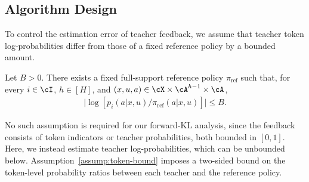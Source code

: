 \documentclass[11pt]{article}
\newcommand{\piref}{\pi_{\text{ref}}}
\begin{document}
\subsection{Algorithm Design}
To control the estimation error of teacher feedback, we assume that teacher token log-probabilities differ from those of a fixed reference policy by a bounded amount.
\begin{assumption}
\label{assump:token-bound}
Let $B>0$. There exists a fixed full-support reference policy $\piref$ such that, for every
$i\in\cI$, $h\in[H]$, and
$(x,u,a)\in\cX\times\cA^{h-1}\times\cA$,
\begin{align*}
    \big|
        \log
        [{p_i(a|x,u)}/
             {\piref(a|x,u)}]
    \big|
    \leq B.
\end{align*}
\end{assumption}
No such assumption is required for our forward-KL analysis, since the feedback consists of token indicators or teacher probabilities, both bounded in $[0,1]$. Here, we instead estimate teacher log-probabilities, which can be unbounded below. Assumption~\ref{assump:token-bound} imposes a two-sided bound on the token-level probability ratios between each teacher and the reference policy.
\end{document}
